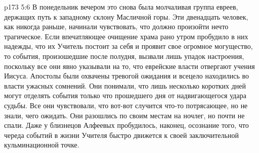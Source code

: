 \vs p173 5:6 В понедельник вечером это снова была молчаливая группа евреев, держащих путь к западному склону Масличной горы. Эти двенадцать человек, как никогда раньше, начинали чувствовать, что должно произойти нечто трагическое. Если впечатляющее очищение храма рано утром пробудило в них надежды, что их Учитель постоит за себя и проявит свое огромное могущество, то события, произошедшие после полудня, вызвали лишь упадок настроения, поскольку все они явно указывали на то, что еврейские власти отвергают учения Иисуса. Апостолы были охвачены тревогой ожидания и всецело находились во власти ужасных сомнений. Они понимали, что лишь несколько коротких дней могут отделять события только что прошедшего дня от надвигающегося удара судьбы. Все они чувствовали, что вот\hyp{}вот случится что\hyp{}то потрясающее, но не знали, чего ожидать. Они разошлись по своим местам на ночлег, но почти не спали. Даже у близнецов Алфеевых пробудилось, наконец, осознание того, что череда событий в жизни Учителя быстро движется к своей заключительной кульминационной точке.
